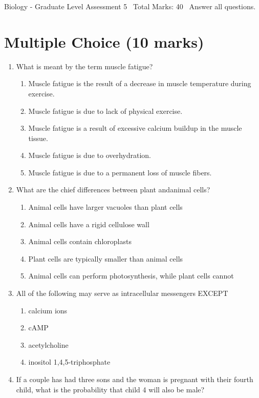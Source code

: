 \documentclass[12pt]{article}
\begin{document}
\begin{center}
Biology - Graduate Level Assessment 5 \
Total Marks: 40 \
Answer all questions.
\end{center}

\section*{Multiple Choice (10 marks)}
\begin{enumerate}[label=\arabic*.]
\item What is meant by the term muscle fatigue?
\begin{enumerate}[label=(\alph*)]
    \item Muscle fatigue is the result of a decrease in muscle temperature during exercise.
    \item Muscle fatigue is due to lack of physical exercise.
    \item Muscle fatigue is a result of excessive calcium buildup in the muscle tissue.
    \item Muscle fatigue is due to overhydration.
    \item Muscle fatigue is due to a permanent loss of muscle fibers.
\end{enumerate}
\item What are the chief differences between plant andanimal cells?
\begin{enumerate}[label=(\alph*)]
    \item Animal cells have larger vacuoles than plant cells
    \item Animal cells have a rigid cellulose wall
    \item Animal cells contain chloroplasts
    \item Plant cells are typically smaller than animal cells
    \item Animal cells can perform photosynthesis, while plant cells cannot
\end{enumerate}
\item All of the following may serve as intracellular messengers EXCEPT
\begin{enumerate}[label=(\alph*)]
    \item calcium ions
    \item cAMP
    \item acetylcholine
    \item inositol 1,4,5-triphosphate
\end{enumerate}
\item If a couple has had three sons and the woman is pregnant with their fourth child, what is the probability that child 4 will also be male?

\end{enumerate}
\end{document}
